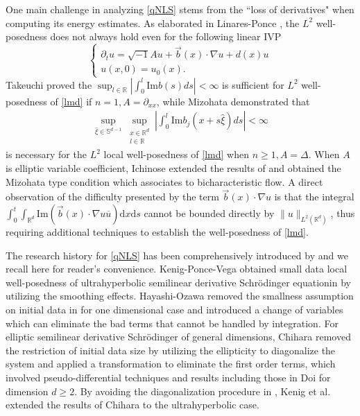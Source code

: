 \documentclass[10pt,twoside,a4paper]{article}
\numberwithin{equation}{section}\allowdisplaybreaks
\def\geq{\geqslant}
\begin{document}
One main challenge in analyzing \eqref{qNLS} stems from the ``loss of derivatives" when computing its energy estimates.
As elaborated in Linares-Ponce \cite{linares2014introduction},   the $ L^2 $ well-posedness does not always hold even for the following linear IVP
\begin{equation} \label{lmd}
	\begin{cases}
		\partial_t u=\sqrt{-1} A u+\vec{b}(x) \cdot \nabla u+d(x) u  \\
		u(x, 0)=u_0(x).
	\end{cases}
\end{equation}
  Takeuchi \cite{takeuchi1974necessary}  proved the $ \sup _{l \in \mathbb{R}}\left|\int_0^l \mathrm{Im} b(s) d s\right|<\infty $ is sufficient for $ L^2 $ well-posedness of \eqref{lmd} if $ n=1, A=\partial_{xx} $, while Mizohata \cite{mizohata3cauchy} demonstrated that
\begin{align} \label{mcon}
	\sup _{\widehat{\xi} \in \mathbb{S}^{d-1}} \sup _{\substack{x \in \mathbb{R}^d \\ l \in \mathbb{R}}}\left|\int_0^l \mathrm{Im}  b_j(x+s \widehat{\xi}) d s\right|<\infty
\end{align}
	is necessary for the $L^2$ local well-posedness  of \eqref{lmd}  when  $ n\geq 1, A=\Delta $.  When $ A $ is elliptic variable coefficient, Ichinose  \cite{wataru1987cauchy} extended the results of \cite{mizohata3cauchy} and  obtained the Mizohata type condition  which associates to bicharacteristic flow. A direct observation of the difficulty presented by the term $\vec{b}(x) \cdot \nabla u$ is that the integral $ \int_0^t \int_{\mathbb{R}^d} \mathrm{Im} (\vec{b}(x) \cdot \nabla u \overline{u})  \mathrm{d} x  \mathrm{d} s $ cannot be bounded directly by $ \| u \|_{L^2(\mathbb{R}^d)} $, thus requiring additional techniques to establish the well-posedness of \eqref{lmd}.

	
	

The research history for \eqref{qNLS} has been  comprehensively introduced by \cite{kenig2004cauchy,kenig2006general,marzuola2012quasilinear,marzuola2021quasilinear,linares2014introduction,ifrim2023global}  and  we recall here for reader's convenience.  Kenig-Ponce-Vega  \cite{kenig1993small}  obtained small data local well-posedness  of ultrahyperbolic semilinear derivative Schr\"odinger equationin by utilizing the  smoothing effects.  Hayashi-Ozawa \cite{hayashi1994remarks} removed the smallness assumption on initial data in \cite{kenig1993small}  for one dimensional case and  introduced  a change of variables which can eliminate the bad terms that cannot be handled by integration.  For elliptic  semilinear derivative Schr\"odinger of general dimensions,  Chihara \cite{Chihara} removed the restriction of  initial data size by  utilizing the ellipticity to diagonalize the system and    applied   a transformation to eliminate
the  first order terms, which involved pseudo-differential
techniques and results including those in Doi \cite{Doi1994} for dimension $ d\geq 2 $. By avoiding the diagonalization procedure in \cite{Chihara}, Kenig et al. \cite{kenig1998smoothing} extended the results of  Chihara \cite{Chihara} to the ultrahyperbolic case.
\end{document}
